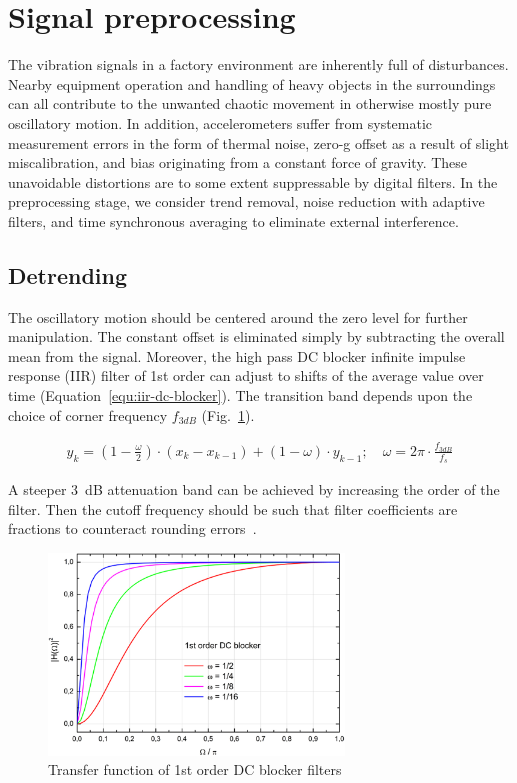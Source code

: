 \section{Signal preprocessing} \label{section:signal-preprocessing}
The vibration signals in a factory environment are inherently full of disturbances. Nearby equipment operation and handling of heavy objects in the surroundings can all contribute to the unwanted chaotic movement in otherwise mostly pure oscillatory motion. In addition, accelerometers suffer from systematic measurement errors in the form of thermal noise, zero-g offset as a result of slight miscalibration, and bias originating from a constant force of gravity. These unavoidable distortions are to some extent suppressable by digital filters. In the preprocessing stage, we consider trend removal, noise reduction with adaptive filters, and time synchronous averaging to eliminate external interference.

\subsection{Detrending}
The oscillatory motion should be centered around the zero level for further manipulation. The constant offset is eliminated simply by subtracting the overall mean from the signal. Moreover, the high pass DC blocker infinite impulse response (IIR) filter of 1st order can adjust to shifts of the average value over time (Equation~\ref{equ:iir-dc-blocker}). The transition band depends upon the choice of corner frequency $f_{3dB}$ (Fig.~\ref{fig:dc-blocker}).

\begin{ceqn}\begin{align} \label{equ:iir-dc-blocker}
y_k = (1 - \frac{\omega}{2}) \cdot (x_k  -  x_{k - 1}) + (1 - \omega) \cdot y_{k - 1}; \quad \omega = 2\pi \cdot \frac{f_{3dB}}{f_s}
\end{align}\end{ceqn}

A steeper 3~dB attenuation band can be achieved by increasing the order of the filter. Then the cutoff frequency should be such that filter coefficients are fractions to counteract rounding errors~\cite{tittelbach-helmrich_digital_2021}.

\begin{figure}[h]
	\centering
	\includegraphics[width=0.7\textwidth]{assets/analysis/iir-1-dc-blocker-band.jpg}
	\caption{Transfer function of 1st order DC blocker filters ~\cite{tittelbach-helmrich_digital_2021}}
	\label{fig:dc-blocker}
\end{figure}

